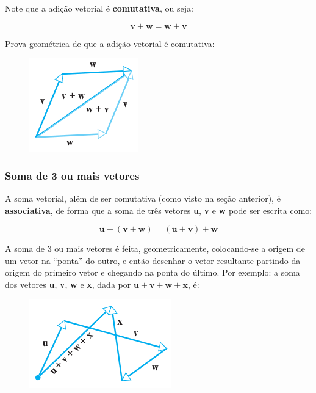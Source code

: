 \documentclass[pdftex, brazil, 12pt, twoside]{article}
\newcommand{\vet}[1]{\textbf{#1}}
\begin{document}
Note que a adição vetorial é \textbf{comutativa}, ou seja:

\begin{equation}
  \vet{v} + \vet{w} = \vet{w} + \vet{v}
\end{equation}

Prova geométrica de que a adição vetorial é comutativa:

\begin{figure}[H]
  \begin{center}
    \includegraphics[scale=0.6]{imagens/vet006.png}
  \end{center}
\end{figure}

\subsubsection{Soma de 3 ou mais vetores}
\label{evd-geom-bi-tri-n-dimen-soma-3+}

A soma vetorial, além de ser comutativa (como visto na seção anterior), é
\textbf{associativa}, de forma que a soma de três vetores \vet{u}, \vet{v} e \vet{w}
pode ser escrita como:

\begin{equation}
  \vet{u} + (\vet{v} + \vet{w}) = (\vet{u} + \vet{v}) + \vet{w}
\end{equation}

A soma de 3 ou mais vetores é feita, geometricamente, colocando-se a origem de um vetor na ``ponta''
do outro, e então desenhar o vetor resultante partindo da origem do primeiro vetor e
chegando na ponta do último. Por exemplo: a soma dos vetores \vet{u}, \vet{v}, \vet{w} e \vet{x}, dada por
$\vet{u} + \vet{v} + \vet{w} + \vet{x}$, é:

\begin{figure}[H]
  \begin{center}
    \includegraphics[scale=0.6]{imagens/vet010.png}
  \end{center}
\end{figure}
\end{document}
